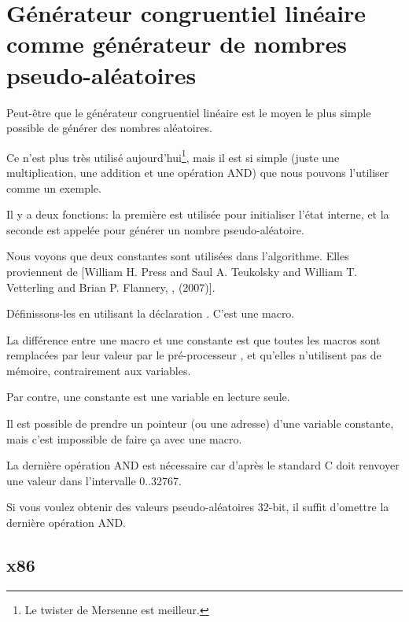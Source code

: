 \section[Générateur congruentiel linéaire]{Générateur congruentiel linéaire comme générateur de nombres pseudo-aléatoires}
\label{LCG_simple}

Peut-être que le générateur congruentiel linéaire est le moyen le plus simple possible
de générer des nombres aléatoires.

Ce n'est plus très utilisé aujourd'hui\footnote{Le twister de Mersenne est meilleur.},
mais il est si simple (juste une multiplication, une addition et une opération AND)
que nous pouvons l'utiliser comme un exemple.



Il y a deux fonctions: la première est utilisée pour initialiser l'état interne,
et la seconde est appelée pour générer un nombre pseudo-aléatoire.

Nous voyons que deux constantes sont utilisées dans l'algorithme.
Elles proviennent de
[William H. Press and Saul A. Teukolsky and William T. Vetterling and Brian P. Flannery, , (2007)].

Définissons-les en utilisant la déclaration \CCpp {}. C'est une macro.

La différence entre une macro \CCpp et une constante est que toutes les macros sont
remplacées par leur valeur par le pré-processeur \CCpp, et qu'elles n'utilisent pas
de mémoire, contrairement aux variables.

Par contre, une constante est une variable en lecture seule.

Il est possible de prendre un pointeur (ou une adresse) d'une variable constante,
mais c'est impossible de faire ça avec une macro.

La dernière opération AND est nécessaire car d'après le standard C 
doit renvoyer une valeur dans l'intervalle 0..32767.

Si vous voulez obtenir des valeurs pseudo-aléatoires 32-bit, il suffit d'omettre
la dernière opération AND.

\subsection{x86}



